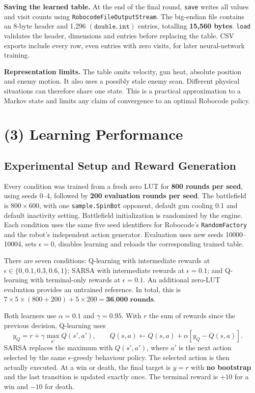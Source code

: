 \documentclass[11pt,letterpaper]{article}
\begin{document}
\textbf{Saving the learned table.} At the end of the final round, \texttt{save} writes all values and visit counts using \texttt{RobocodeFileOutputStream}. The big-endian file contains an 8-byte header and 1,296 $(\texttt{double},\texttt{int})$ entries, totalling \textbf{15,560 bytes}. \texttt{load} validates the header, dimensions and entries before replacing the table. CSV exports include every row, even entries with zero visits, for later neural-network training.

\textbf{Representation limits.} The table omits velocity, gun heat, absolute position and enemy motion. It also uses a possibly stale enemy scan. Different physical situations can therefore share one state. This is a practical approximation to a Markov state and limits any claim of convergence to an optimal Robocode policy.

\newpage
\section*{(3) Learning Performance}
\subsection*{Experimental Setup and Reward Generation}
Every condition was trained from a fresh zero LUT for \textbf{800 rounds per seed}, using seeds 0--4, followed by \textbf{200 evaluation rounds per seed}. The battlefield is $800\times600$, with one \texttt{sample.SpinBot} opponent, default gun cooling 0.1 and default inactivity setting. Battlefield initialization is randomized by the engine. Each condition uses the same five seed identifiers for Robocode's \texttt{RandomFactory} and the robot's independent action generator. Evaluation uses new seeds 10000--10004, sets $\epsilon=0$, disables learning and reloads the corresponding trained table.

There are seven conditions: Q-learning with intermediate rewards at $\epsilon\in\{0,0.1,0.3,0.6,1\}$; SARSA with intermediate rewards at $\epsilon=0.1$; and Q-learning with terminal-only rewards at $\epsilon=0.1$. An additional zero-LUT evaluation provides an untrained reference. In total, this is $7\times5\times(800+200)+5\times200=\textbf{36,000 rounds}$.

Both learners use $\alpha=0.1$ and $\gamma=0.95$. With $r$ the sum of rewards since the previous decision, Q-learning uses
\[
y_Q=r+\gamma\max_{a'}Q(s',a'),\qquad
Q(s,a)\leftarrow Q(s,a)+\alpha[y_Q-Q(s,a)].
\]
SARSA replaces the maximum with $Q(s',a')$, where $a'$ is the next action selected by the same $\epsilon$-greedy behaviour policy. The selected action is then actually executed. At a win or death, the final target is $y=r$ with \textbf{no bootstrap} and the last transition is updated exactly once. The terminal reward is $+10$ for a win and $-10$ for death.
\end{document}
